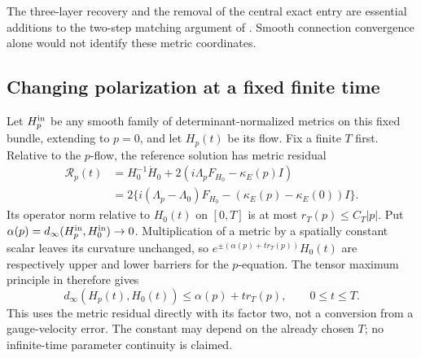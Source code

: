 \documentclass[11pt]{amsart}
\theoremstyle{definition}
\theoremstyle{remark}
\begin{document}
The three-layer recovery and the removal of the central exact
entry are essential additions to the two-step matching argument
of \cite[Lemma 8.1]{WuebbenFlow26}. Smooth connection convergence
alone would not identify these metric coordinates.

\subsection{Changing polarization at a fixed finite time}
Let $H_p^{\rm in}$ be any smooth family of determinant-normalized
metrics on this fixed bundle, extending to $p=0$, and let $H_p(t)$
be its flow. Fix a finite $T$ first. Relative to the $p$-flow,
the reference solution has metric residual
\begin{equation}\label{eq:parameter-residual}
 \begin{split}
 \mathcal R_p(t)
 &=H_0^{-1}\dot H_0+
           2(i\Lambda_pF_{H_0}-\kappa_E(p)I)\\
 &=2\{i(\Lambda_p-\Lambda_0)F_{H_0}
                  -(\kappa_E(p)-\kappa_E(0))I\}.
 \end{split}
\end{equation}
Its operator norm relative to $H_0(t)$ on $[0,T]$ is at most
$r_T(p)\le C_T|p|$. Put
$\alpha(p)=d_\infty(H_p^{\rm in},H_0^{\rm in})\to0$.
Multiplication of a metric by a spatially constant scalar leaves
its curvature unchanged, so
$e^{\pm(\alpha(p)+tr_T(p))}H_0(t)$ are respectively upper
and lower barriers for the $p$-equation. The tensor maximum
principle in \cite[Proposition 4.3 and equation (4.9)]{HKKP18}
therefore gives
\begin{equation}\label{eq:finite-time-order}
 d_\infty(H_p(t),H_0(t))\le\alpha(p)+tr_T(p),
                    \qquad 0\le t\le T .
\end{equation}
This uses the metric residual directly with its factor two,
not a conversion from a gauge-velocity error. The constant may
depend on the already chosen $T$; no infinite-time parameter
continuity is claimed.
\end{document}
